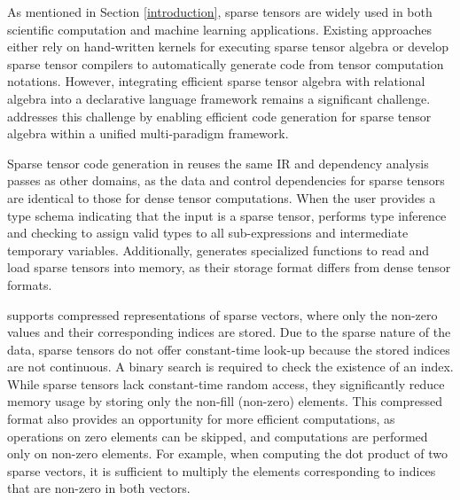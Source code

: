 \documentclass[acmsmall,nonacm]{acmart}\settopmatter{printfolios=true,printccs=false,printacmref=false}
\newcommand{\rhyme}{\text{Rhyme}\xspace}
\begin{document}
As mentioned in Section \ref{introduction}, sparse tensors are widely used in both scientific computation and machine learning applications. Existing approaches either rely on hand-written kernels for executing sparse tensor algebra or develop sparse tensor compilers to automatically generate code from tensor computation notations. However, integrating efficient sparse tensor algebra with relational algebra into a declarative language framework remains a significant challenge. \rhyme addresses this challenge by enabling efficient code generation for sparse tensor algebra within a unified multi-paradigm framework.\par
Sparse tensor code generation in \rhyme reuses the same IR and dependency analysis passes as other domains, as the data and control dependencies for sparse tensors are identical to those for dense tensor computations. When the user provides a type schema indicating that the input is a sparse tensor, \rhyme performs type inference and checking to assign valid types to all sub-expressions and intermediate temporary variables. Additionally, \rhyme generates specialized functions to read and load sparse tensors into memory, as their storage format differs from dense tensor formats.\par
\rhyme supports compressed representations of sparse vectors, where only the non-zero values and their corresponding indices are stored. Due to the sparse nature of the data, sparse tensors do not offer constant-time look-up because the stored indices are not continuous. A binary search is required to check the existence of an index. While sparse tensors lack constant-time random access, they significantly reduce memory usage by storing only the non-fill (non-zero) elements. This compressed format also provides an opportunity for more efficient computations, as operations on zero elements can be skipped, and computations are performed only on non-zero elements. For example, when computing the dot product of two sparse vectors, it is sufficient to multiply the elements corresponding to indices that are non-zero in both vectors.
\end{document}
